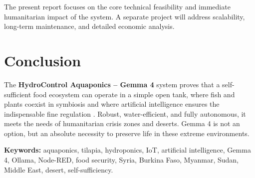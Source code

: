 \documentclass[12pt,a4paper]{article}
\begin{document}
The present report focuses on the core technical feasibility and immediate humanitarian impact of the system. A separate project will address scalability, long-term maintenance, and detailed economic analysis.

\section{Conclusion}

The \textbf{HydroControl Aquaponics -- Gemma 4} system proves that a self-sufficient food ecosystem can operate in a simple open tank, where fish and plants coexist in symbiosis and where artificial intelligence ensures the indispensable fine regulation \cite{gemma4card}. Robust, water-efficient, and fully autonomous, it meets the needs of humanitarian crisis zones and deserts. Gemma 4 is not an option, but an absolute necessity to preserve life in these extreme environments.

\vspace{5mm}
\noindent\textbf{Keywords:} aquaponics, tilapia, hydroponics, IoT, artificial intelligence, Gemma 4, Ollama, Node-RED, food security, Syria, Burkina Faso, Myanmar, Sudan, Middle East, desert, self-sufficiency.
\end{document}
